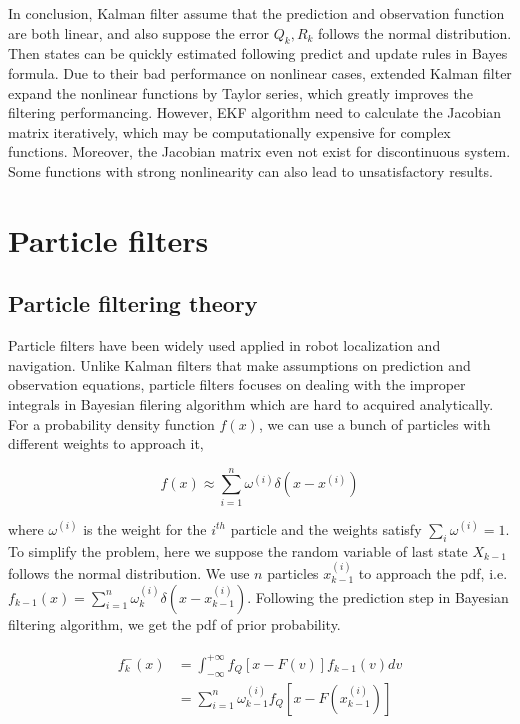 \documentclass[conference]{IEEEtran}
\begin{document}
	In conclusion, Kalman filter assume that the prediction and observation function are both linear, and also suppose the error $Q_{k},R_{k}$ follows the normal distribution. Then states can be quickly estimated following predict and update rules in Bayes formula. Due to their bad performance on nonlinear cases, extended Kalman filter expand the nonlinear functions by Taylor series, which greatly improves the filtering performancing. However, EKF algorithm need to calculate the Jacobian matrix iteratively, which may be computationally expensive for complex functions. Moreover, the Jacobian matrix even not exist for discontinuous system. Some functions with strong nonlinearity can also lead to unsatisfactory results.

	\section{Particle filters}
	
	\subsection{Particle filtering theory}

	Particle filters have been widely used applied in robot localization and navigation. Unlike Kalman filters that make assumptions on prediction and observation equations, particle filters focuses on dealing with the improper integrals in Bayesian filering algorithm which are hard to acquired analytically. For a probability density function $f(x)$, we can use a bunch of particles with different weights to approach it,
	
	\begin{equation}
	f(x)\approx \sum_{i=1}^{n}\omega^{(i)} \delta (x-x^{(i)})
	\label{eq22}
	\end{equation}
	
	where $\omega^{(i)}$ is the weight for the $i^{th}$ particle and the weights satisfy $\sum_{i} \omega^{(i)}=1$. To simplify the problem, here we suppose the random variable of last state $X_{k-1}$ follows the normal distribution. We use $n$ particles $x_{k-1}^{(i)}$ to approach the pdf, i.e. $f_{k-1}(x)=\sum_{i=1}^{n}\omega_{k}^{(i)} \delta (x-x_{k-1}^{(i)})$. Following the prediction step in Bayesian filtering algorithm, we get the pdf of prior probability.
	
	\begin{equation}
	\begin{split}
	\begin{aligned}
	f_{k}^{-}(x)&=\int_{-\infty}^{+\infty}f_{Q}[x-F(v)]f_{k-1}(v)dv\\
	&=\sum_{i=1}^{n}\omega _{k-1}^{(i)}f_{Q}[x-F(x_{k-1}^{(i)})]
	\label{eq23}
	\end{aligned}
	\end{split}
	\end{equation}
	
\end{document}
